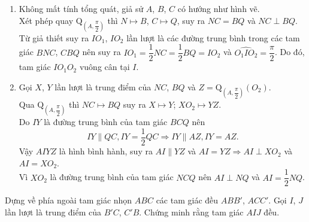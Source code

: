 \begin{bt}
{\begin{enumerate}
			\item Không mất tính tổng quát, giả sử $A$, $B$, $C$ có hướng như hình vẽ.\\
			Xét phép quay $\mathrm{Q}_{\left(A,\dfrac{\pi}{2}\right)}$ thì $N\mapsto B$, $C\mapsto Q$, suy ra $NC=BQ$ và $NC\perp BQ$.\\
			Từ giả thiết suy ra $IO_1$, $IO_2$ lần lượt là các đường trung bình trong các tam giác $BNC$, $CBQ$ nên suy ra $IO_1=\dfrac{1}{2}NC=\dfrac{1}{2}BQ=IO_2$ và $\widehat{O_1IO_2}=\dfrac{\pi}{2}$. Do đó, tam giác $IO_1O_2$ vuông cân tại $I$. 
			\item Gọi $X$, $Y$ lần lượt là  trung điểm của $NC$, $BQ$ và $Z=\mathrm{Q}_{\left(A,\dfrac{\pi}{2}\right)}\left(O_2\right)$.\\
			Qua $\mathrm{Q}_{\left(A,\dfrac{\pi}{2}\right)}$ thì $NC\mapsto BQ$ suy ra $X\mapsto Y$; $XO_2\mapsto YZ$.\\
			Do $IY$ là đường trung bình của tam giác $BCQ$ nên
			 $$IY\parallel QC, IY=\dfrac{1}{2}QC\Rightarrow
			  IY\parallel AZ, IY=AZ.$$
			Vậy $AIYZ$ là hình bình hành, suy ra $AI\parallel YZ$ và $AI=YZ\Rightarrow AI\perp XO_2$ và $AI=XO_2$.\\
			  Vì $XO_2$ là đường trung bình của tam giác $NCQ$ nên $AI\perp
			   NQ$ và $AI=\dfrac{1}{2}NQ$.
		\end{enumerate}
	}
\end{bt}

\begin{bt}%
Dựng về phía ngoài tam giác nhọn $ABC$ các tam giác đều $ABB'$, $ACC'$. Gọi $I$, $J$ lần lượt là trung điểm của $B'C$, $C'B$. Chứng minh rằng tam giác $AIJ$ đều.
\end{bt}
